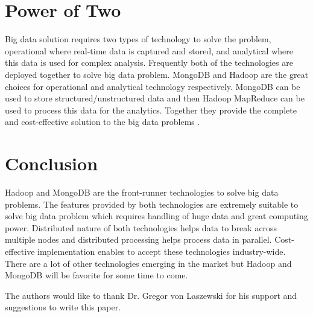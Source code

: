 \documentclass[sigconf]{acmart}
\begin{document}
\section{Power of Two}
Big data solution requires two types of technology to solve the problem, operational where real-time data is captured and stored, and analytical where this data is used for complex analysis. Frequently both of the technologies are deployed together to solve big data problem. MongoDB and Hadoop are the great choices for operational and analytical technology respectively. MongoDB can be used to store structured/unstructured data and then Hadoop MapReduce can be used to process this data for the analytics. Together they provide the complete and cost-effective solution to the big data problems \cite{www-mongo-bigdata}.

\section{Conclusion}
Hadoop and MongoDB are the front-runner technologies to solve big data problems. The features provided by both technologies are extremely suitable to solve big data problem which requires handling of huge data and great computing power. Distributed nature of both technologies helps data to break across multiple nodes and distributed processing helps process data in parallel. Cost-effective implementation enables to accept these technologies industry-wide. There are a lot of other technologies emerging in the market but Hadoop and MongoDB will be favorite for some time to come.

\begin{acks}

  The authors would like to thank Dr. Gregor von Laszewski for his
  support and suggestions to write this paper.

\end{acks}


 

\appendix


\end{document}
